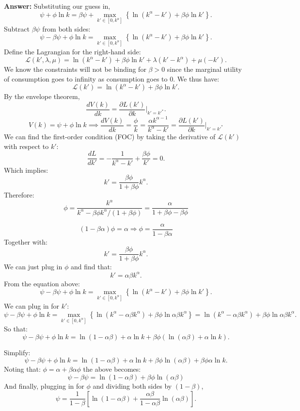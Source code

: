 \documentclass[11pt]{extarticle}
\theoremstyle{plain}
\theoremstyle{definition}
\begin{document}
\begin{enumerate}[(a)]
\begin{enumerate}[(a)]
\textbf{Answer:} Substituting our guess in, 
\[
\psi + \phi \ln k = \beta \psi + \max_{k' \in [0, k^\alpha]} \left\{ \ln (k^\alpha - k') + \beta \phi \ln k' \right\}.
\]
Subtract $\beta \psi$ from both sides:
\[
\psi - \beta \psi + \phi \ln k = \max_{k' \in [0, k^\alpha]} \left\{ \ln (k^\alpha - k') + \beta \phi \ln k' \right\}.
\]
Define the Lagrangian for the right-hand side:
\[
\mathcal{L}(k', \lambda, \mu) = \ln(k^\alpha - k') + \beta \phi \ln k' + \lambda(k' - k^\alpha) + \mu(-k').
\]
We know the constraints will not be binding for $\beta>0$ since the marginal utility of consumption goes to infinity as consumption goes to 0. We thus have:
\[
\mathcal{L}(k') = \ln (k^\alpha - k') + \beta \phi \ln k'.
\]
By the envelope theorem,
\[
\frac{dV(k)}{dk} = \frac{\partial L(k')}{\partial k} \bigg|_{k' = k'^*}.
\]
\[
V(k) = \psi + \phi \ln k \implies \frac{dV(k)}{dk} = \frac{\phi}{k} = \frac{\alpha k^{\alpha - 1}}{k^\alpha - k'} = \frac{\partial L(k')}{\partial k} \bigg|_{k' = k'^*}
\]
We can find the first-order condition (FOC) by taking the derivative of $\mathcal{L}(k')$ with respect to $k'$:
\[
\frac{dL}{dk'} = -\frac{1}{k^\alpha - k'} + \frac{\beta \phi}{k'} = 0.
\]
Which implies: \[
k' = \frac{\beta \phi}{1 + \beta \phi} k^\alpha.
\] 
Therefore: 
\[
\phi = \frac{k^\alpha}{k^\alpha - \beta \phi k^\alpha / (1+ \beta \phi)} = \frac{\alpha}{1+ \beta \phi - \beta \phi}
\]

\[
(1- \beta \alpha) \phi = \alpha
\Rightarrow \phi = \frac{\alpha}{1- \beta \alpha}
\]
Together with:
\[
k' = \frac{\beta \phi}{1 + \beta \phi} k^\alpha.
\] 
We can just plug in $\phi$ and find that:
\[
k' = \alpha \beta k^\alpha.
\]
From the equation above: 
\[
\psi - \beta \psi + \phi \ln k = \max_{k' \in [0, k^\alpha]} \left\{ \ln (k^\alpha - k') + \beta \phi \ln k' \right\}.
\]
We can plug in for $k'$:
\[
\psi - \beta \psi + \phi \ln k = \max_{k' \in [0, k^\alpha]} \left\{ \ln (k^\alpha - \alpha \beta k^\alpha) + \beta \phi \ln \alpha \beta k^\alpha \right\} =\ln (k^\alpha - \alpha \beta k^\alpha) + \beta \phi \ln \alpha \beta k^\alpha.
\]
So that:
\[
\psi - \beta \psi + \phi \ln k = \ln(1 - \alpha \beta) + \alpha \ln k + \beta \phi \left( \ln(\alpha \beta) + \alpha \ln k \right).
\]

Simplify:
\[
\psi - \beta \psi + \phi \ln k = \ln(1 - \alpha \beta) + \alpha \ln k + \beta \phi \ln(\alpha \beta) + \beta \phi \alpha \ln k.
\]
Noting that: 
\(
\phi = \alpha + \beta\alpha\phi
\)
 the above becomes:
\[
\psi - \beta \psi = \ln(1 - \alpha \beta) + \beta \phi \ln(\alpha \beta)
\]
And finally, plugging in for $\phi$ and dividing both sides by $(1-\beta)$,
\[
\psi = \frac{1}{1 - \beta} \left[ \ln(1 - \alpha \beta) + \frac{\alpha \beta}{1 - \alpha \beta} \ln(\alpha \beta) \right].
\]


\end{enumerate}
\end{enumerate}
\end{document}

